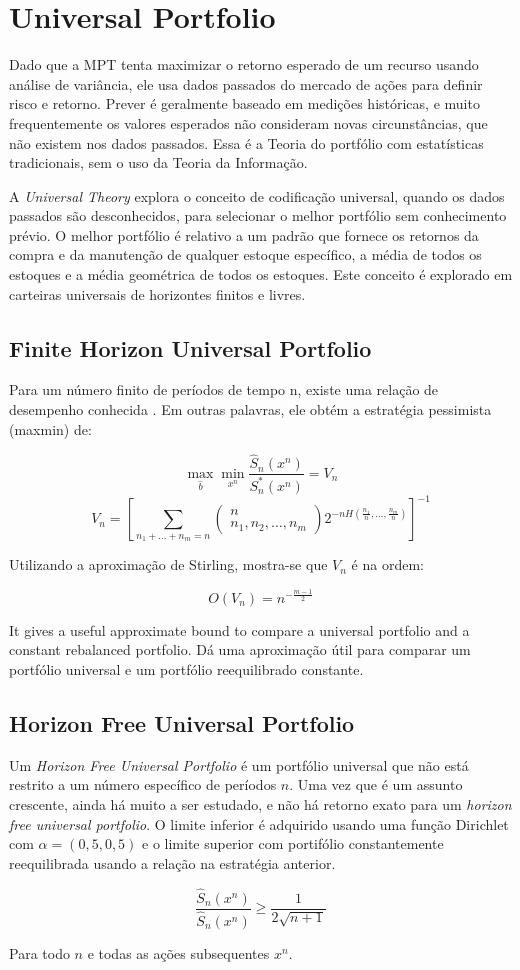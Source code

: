  \section{Universal Portfolio}
Dado que a MPT tenta maximizar o retorno esperado de um recurso usando análise de variância, ele usa dados passados do mercado de ações para definir risco e retorno. Prever é geralmente baseado em medições históricas, e muito frequentemente os valores esperados não consideram novas circunstâncias, que não existem nos dados passados. Essa é a Teoria do portfólio com estatísticas tradicionais, sem o uso da Teoria da Informação.

A \emph{Universal Theory} explora o conceito de codificação universal, quando os dados passados são desconhecidos, para selecionar o melhor portfólio sem conhecimento prévio. O melhor portfólio é relativo a um padrão que fornece os retornos da compra e da manutenção de qualquer estoque específico, a média de todos os estoques e a média geométrica de todos os estoques. Este conceito é explorado em carteiras universais de horizontes finitos e livres.
 
\subsection{Finite Horizon Universal Portfolio}
Para um número finito de períodos de tempo n, existe uma relação de desempenho conhecida \cite{vercimakgambling}. Em outras palavras, ele obtém a estratégia pessimista (maxmin) de:

\[\mathop {\max }\limits_{\hat b} \mathop {\min }\limits_{{x^n}} \frac{{{{\hat S}_n}({x^n})}}{{S_n^*({x^n})}} = {V_n}\]
\[{V_n} = {\left[ {\mathop \sum \limits_{{n_1} +  \ldots  + {n_m} = n}^{} \left( {\begin{array}{*{20}{c}}
n\\
{{n_1},{n_2}, \ldots ,{n_m}}
\end{array}} \right){2^{ - nH\left( {\frac{{{n_1}}}{n}, \ldots ,\frac{{{n_m}}}{n}} \right)}}} \right]^{ - 1}}\]

Utilizando a aproximação de Stirling, mostra-se que $V_n$ é na ordem:
 
\[O(V_{n} ) = n^{-\frac{m-1}{2}}\]

It gives a useful approximate bound to compare a universal portfolio and a constant rebalanced portfolio.
Dá uma aproximação útil para comparar um portfólio universal e um portfólio reequilibrado constante.

\subsection{Horizon Free Universal Portfolio}
Um \emph{Horizon Free Universal Portfolio} é um portfólio universal que não está restrito a um número específico de períodos $ n $. Uma vez que é um assunto crescente, ainda há muito a ser estudado, e não há retorno exato para um \emph{horizon free universal portfolio}.
O limite inferior é adquirido usando uma função Dirichlet com $ \alpha = (0,5, 0,5) $ e o limite superior com portifólio constantemente reequilibrada usando a relação na estratégia anterior.

\[\frac{{{{\hat S}_n}\left( {{x^n}} \right)}}{{{{\hat S}_n}\left( {{x^n}} \right)}} \ge \frac{1}{{2\sqrt {n + 1} }}\]

Para todo $n$ e todas as ações subsequentes $x^n$.
